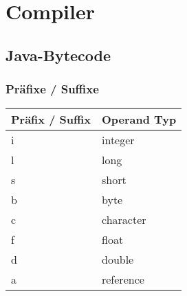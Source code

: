 \chapter{Compiler}
\section{Java-Bytecode}
\subsection{Präfixe / Suffixe}
\begin{table}[h]
	\centering
	\label{my-label}
	\begin{tabular}{l|l}
		Präfix / Suffix	& Operand Typ\\ \hline
		i	&	integer		\\ \hline
		l	&	long		\\ \hline
		s	&	short		\\ \hline
		b	&	byte		\\ \hline
		c	&	character	\\ \hline
		f	&	float		\\ \hline
		d	&	double		\\ \hline
		a	&	reference	\\
	\end{tabular}
\end{table}
